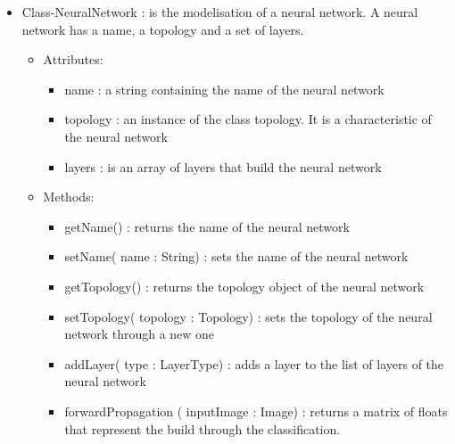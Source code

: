 \documentclass[parskip=full]{scrartcl}
\begin{document}
\pagebreak



\begin{itemize}
	\item Class-NeuralNetwork : is the modelisation of a neural network. A neural network has a name, a topology and a set of layers.
	\begin{itemize}
		\item Attributes:
		\begin{itemize}
			\item name : a string containing the name of the neural network
			\item topology : an instance of the class topology. It is a characteristic of the neural network
			\item layers : is an array of layers that build the neural network
		\end{itemize}
		\item Methods:
		\begin{itemize}
			\item getName() : returns the name of the neural network
			\item setName( name : String) : sets the name of the neural network
			\item getTopology() : returns the topology object of the neural network
			\item setTopology( topology : Topology) : sets the topology of the neural network through a new one
			\item addLayer( type : LayerType) : adds a layer to the list of layers of the neural network
			\item forwardPropagation ( inputImage : Image) : returns a matrix of floats that represent the build through the classification.
		\end{itemize}
	\end{itemize}
\end{itemize}



\pagebreak
\end{document}
